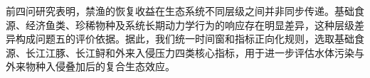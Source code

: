 前四问研究表明，禁渔的恢复收益在生态系统不同层级之间并非同步传递。基础食源、经济鱼类、珍稀物种及系统长期动力学行为的响应存在明显差异，这种层级差异构成问题五的评价依据。据此，我们统一时间窗和指标正向化规则，选取基础食源、长江江豚、长江鲟和外来入侵压力四类核心指标，用于进一步评估水体污染与外来物种入侵叠加后的复合生态效应。